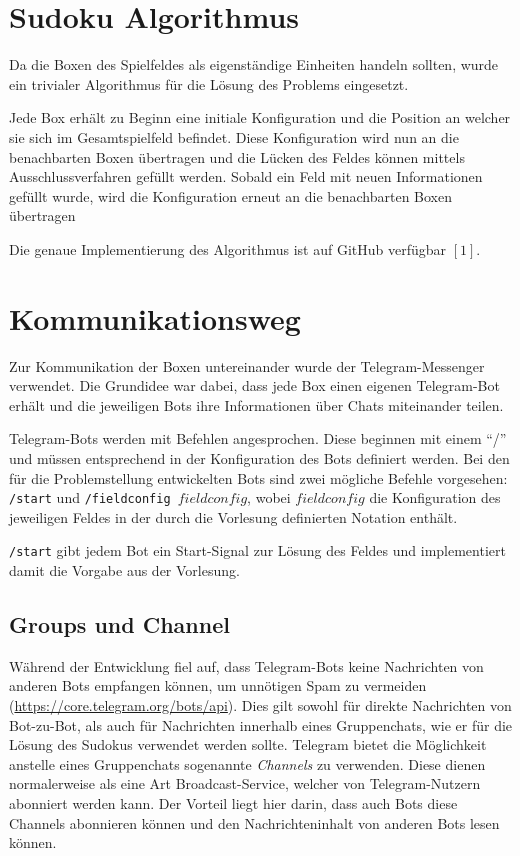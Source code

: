 \documentclass[11pt,parskip=full]{scrartcl}
\begin{document}
\section{Sudoku Algorithmus}
Da die Boxen des Spielfeldes als eigenständige Einheiten handeln sollten, wurde ein trivialer Algorithmus für die Lösung des Problems eingesetzt.

Jede Box erhält zu Beginn eine initiale Konfiguration und die Position an welcher sie sich im Gesamtspielfeld befindet. Diese Konfiguration wird nun an die benachbarten Boxen übertragen und die Lücken des Feldes können mittels Ausschlussverfahren gefüllt werden. Sobald ein Feld mit neuen Informationen gefüllt wurde, wird die Konfiguration erneut an die benachbarten Boxen übertragen

Die genaue Implementierung des Algorithmus ist auf GitHub verfügbar $[1]$.


\section{Kommunikationsweg}

Zur Kommunikation der Boxen untereinander wurde der Telegram-Messenger verwendet. Die Grundidee war dabei, dass jede Box einen eigenen Telegram-Bot erhält und die jeweiligen Bots ihre Informationen über Chats miteinander teilen.

Telegram-Bots werden mit Befehlen angesprochen. Diese beginnen mit einem ``/'' und müssen entsprechend in der Konfiguration des Bots definiert werden. Bei den für die Problemstellung entwickelten Bots sind zwei mögliche Befehle vorgesehen: \texttt{/start} und \texttt{/fieldconfig $fieldconfig$}, wobei \texttt{$fieldconfig$} die Konfiguration des jeweiligen Feldes in der durch die Vorlesung definierten Notation enthält.

\texttt{/start} gibt jedem Bot ein Start-Signal zur Lösung des Feldes und implementiert damit die Vorgabe aus der Vorlesung.

\subsection{Groups und Channel}

Während der Entwicklung fiel auf, dass Telegram-Bots keine Nachrichten von anderen Bots empfangen können, um unnötigen Spam zu vermeiden (\url{https://core.telegram.org/bots/api}). Dies gilt sowohl für direkte Nachrichten von Bot-zu-Bot, als auch für Nachrichten innerhalb eines Gruppenchats, wie er für die Lösung des Sudokus verwendet werden sollte. Telegram bietet die Möglichkeit anstelle eines Gruppenchats sogenannte \textit{Channels} zu verwenden. Diese dienen normalerweise als eine Art Broadcast-Service, welcher von Telegram-Nutzern abonniert werden kann. Der Vorteil liegt hier darin, dass auch Bots diese Channels abonnieren können und den Nachrichteninhalt von anderen Bots lesen können.
\end{document}
